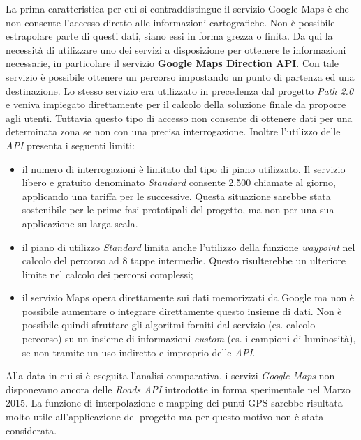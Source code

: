 La prima caratteristica per cui si contraddistingue il servizio Google Maps è che non consente l'accesso diretto alle informazioni cartografiche. Non è possibile estrapolare parte di questi dati, siano essi in forma grezza o finita. Da qui la necessità di utilizzare uno dei servizi a disposizione per ottenere le informazioni necessarie, in particolare il servizio \textbf{Google Maps Direction API}. Con tale servizio è possibile ottenere un percorso impostando un punto di partenza ed una destinazione. Lo stesso servizio era utilizzato in precedenza dal progetto \emph{Path 2.0} e veniva impiegato direttamente per il calcolo della soluzione finale da proporre agli utenti. Tuttavia questo tipo di accesso non consente di ottenere dati per una determinata zona se non con una precisa interrogazione. Inoltre l'utilizzo delle \emph{API} presenta i seguenti limiti:
\begin{itemize}
  \item il numero di interrogazioni è limitato dal tipo di piano utilizzato. Il servizio libero e gratuito denominato \emph{Standard} consente 2,500 chiamate al giorno, applicando una tariffa per le successive. Questa situazione sarebbe stata sostenibile per le prime fasi prototipali del progetto, ma non per una sua applicazione su larga scala.
  \item il piano di utilizzo \emph{Standard} limita anche l'utilizzo della funzione \emph{waypoint} nel calcolo del percorso ad 8 tappe intermedie. Questo risulterebbe un ulteriore limite nel calcolo dei percorsi complessi;
  \item il servizio Maps opera direttamente sui dati memorizzati da Google ma non è possibile aumentare o integrare direttamente questo insieme di dati. Non è possibile quindi sfruttare gli algoritmi forniti dal servizio (es. calcolo percorso) su un insieme di informazioni \emph{custom} (es. i campioni di luminosità), se non tramite un uso indiretto e improprio delle \emph{API}.
\end{itemize}
Alla data in cui si è eseguita l'analisi comparativa, i servizi \emph{Google Maps} non disponevano ancora delle \emph{Roads API} introdotte in forma sperimentale nel Marzo 2015. La funzione di interpolazione e mapping dei punti GPS sarebbe risultata molto utile all'applicazione del progetto ma per questo motivo non è stata considerata.

